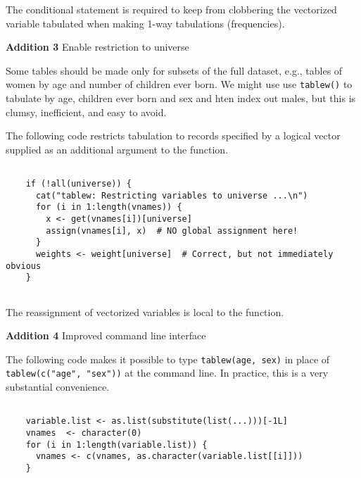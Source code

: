 The conditional statement is required to keep from clobbering the vectorized variable tabulated when making 1-way tabulations (frequencies).


\vspace{12pt}
{\bf Addition 3} Enable restriction to universe

Some tables should be made only for subsets of the full dataset, e.g., tables of women by age and number of children ever born. We might use use {\tt tablew()} to tabulate by age, children ever born and sex and hten index out males, but this is clumsy, inefficient, and easy to avoid.

The following code restricts tabulation to records specified by a logical vector supplied as an additional argument to the function.

\begin{verbatim}

    if (!all(universe)) {
      cat("tablew: Restricting variables to universe ...\n")
      for (i in 1:length(vnames)) {
        x <- get(vnames[i])[universe]
        assign(vnames[i], x)  # NO global assignment here!
      }
      weights <- weight[universe]  # Correct, but not immediately obvious
    }
	
\end{verbatim}

The reassignment of vectorized variables is local to the function.


\vspace{12pt}
{\bf Addition 4} Improved command line interface

The following code makes it possible to type {\tt tablew(age, sex)} in place of {\tt tablew(c("age", "sex"))} at the command line. In practice, this is a very substantial convenience.

\begin{verbatim}

    variable.list <- as.list(substitute(list(...)))[-1L]
    vnames  <- character(0)
    for (i in 1:length(variable.list)) {
      vnames <- c(vnames, as.character(variable.list[[i]]))
    }

\end{verbatim}


